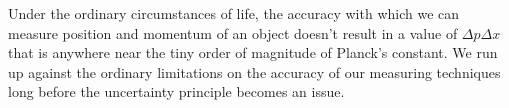 Under the ordinary circumstances of life, the accuracy with which we can measure position
and momentum of an object doesn't result in a value of $\Delta p\Delta x$ that is anywhere
 near the tiny order of magnitude of Planck's constant. We run up against the ordinary
 limitations on the accuracy of our measuring techniques long before the uncertainty
 principle becomes an issue.
